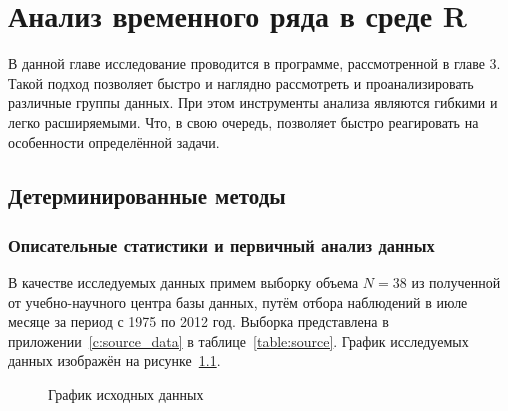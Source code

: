 
\newcommand{\inp}[1]{}
\newcommand{\characteristic}[2]{\inp{#1/characteristics/#2}}
\newcommand{\descriptive}[2]{\inp{#1/descriptive/#2}}
\newcommand{\test}[3]{\inp{#1/test/#2/#3}}
\newcommand{\normaldistr}{$\mathcal{N}(\descriptive{original}{mean}, \descriptive{original}{variance})$}
\newcommand{\resnormaldistr}{$\mathcal{N}(\descriptive{residual}{mean}, \descriptive{residual}{variance})$}

\newpage

\chapter{Анализ временного ряда в среде R}
\label{c:analysis}

В данной главе исследование проводится в программе, рассмотренной в главе 3. Такой подход позволяет быстро и наглядно рассмотреть и проанализировать различные группы данных. При этом инструменты анализа являются гибкими и легко расширяемыми. Что, в свою очередь, позволяет быстро реагировать на особенности определённой задачи.

\section{Детерминированные методы} %
\label{sec:determenistic}

\subsection{Описательные статистики и первичный анализ данных} %
\label{sec:basis}

В качестве исследуемых данных примем выборку объема $ N = 38 $ из полученной от учебно-научного центра базы данных, путём отбора наблюдений в июле месяце за период с 1975 по 2012 год. Выборка представлена в приложении~\ref{c:source_data} в таблице~\ref{table:source}. График исследуемых данных изображён на рисунке~\ref{img:input}.
\begin{figure}[ht]
\caption{График исходных данных}
\label{img:input}
\end{figure}

